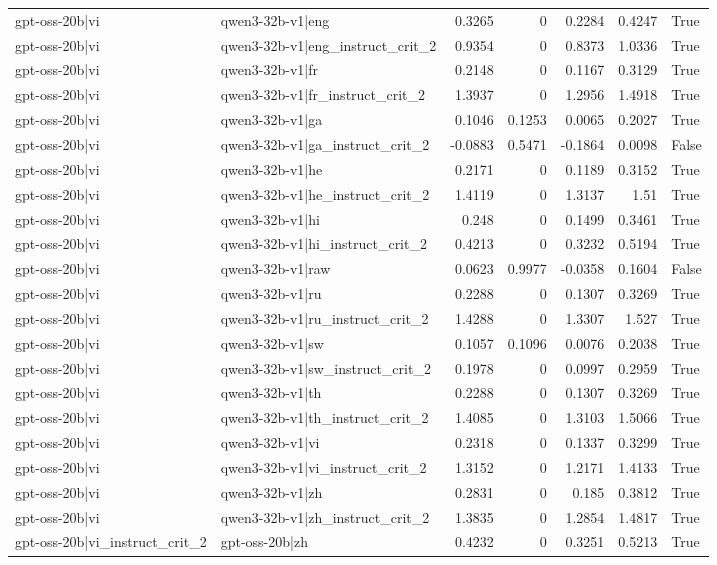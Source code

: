 \begin{table}
\begin{tabular}{l l r r r r l}
gpt-oss-20b|vi & qwen3-32b-v1|eng & 0.3265 & 0 & 0.2284 & 0.4247 & True \\
gpt-oss-20b|vi & qwen3-32b-v1|eng_instruct_crit_2 & 0.9354 & 0 & 0.8373 & 1.0336 & True \\
gpt-oss-20b|vi & qwen3-32b-v1|fr & 0.2148 & 0 & 0.1167 & 0.3129 & True \\
gpt-oss-20b|vi & qwen3-32b-v1|fr_instruct_crit_2 & 1.3937 & 0 & 1.2956 & 1.4918 & True \\
gpt-oss-20b|vi & qwen3-32b-v1|ga & 0.1046 & 0.1253 & 0.0065 & 0.2027 & True \\
gpt-oss-20b|vi & qwen3-32b-v1|ga_instruct_crit_2 & -0.0883 & 0.5471 & -0.1864 & 0.0098 & False \\
gpt-oss-20b|vi & qwen3-32b-v1|he & 0.2171 & 0 & 0.1189 & 0.3152 & True \\
gpt-oss-20b|vi & qwen3-32b-v1|he_instruct_crit_2 & 1.4119 & 0 & 1.3137 & 1.51 & True \\
gpt-oss-20b|vi & qwen3-32b-v1|hi & 0.248 & 0 & 0.1499 & 0.3461 & True \\
gpt-oss-20b|vi & qwen3-32b-v1|hi_instruct_crit_2 & 0.4213 & 0 & 0.3232 & 0.5194 & True \\
gpt-oss-20b|vi & qwen3-32b-v1|raw & 0.0623 & 0.9977 & -0.0358 & 0.1604 & False \\
gpt-oss-20b|vi & qwen3-32b-v1|ru & 0.2288 & 0 & 0.1307 & 0.3269 & True \\
gpt-oss-20b|vi & qwen3-32b-v1|ru_instruct_crit_2 & 1.4288 & 0 & 1.3307 & 1.527 & True \\
gpt-oss-20b|vi & qwen3-32b-v1|sw & 0.1057 & 0.1096 & 0.0076 & 0.2038 & True \\
gpt-oss-20b|vi & qwen3-32b-v1|sw_instruct_crit_2 & 0.1978 & 0 & 0.0997 & 0.2959 & True \\
gpt-oss-20b|vi & qwen3-32b-v1|th & 0.2288 & 0 & 0.1307 & 0.3269 & True \\
gpt-oss-20b|vi & qwen3-32b-v1|th_instruct_crit_2 & 1.4085 & 0 & 1.3103 & 1.5066 & True \\
gpt-oss-20b|vi & qwen3-32b-v1|vi & 0.2318 & 0 & 0.1337 & 0.3299 & True \\
gpt-oss-20b|vi & qwen3-32b-v1|vi_instruct_crit_2 & 1.3152 & 0 & 1.2171 & 1.4133 & True \\
gpt-oss-20b|vi & qwen3-32b-v1|zh & 0.2831 & 0 & 0.185 & 0.3812 & True \\
gpt-oss-20b|vi & qwen3-32b-v1|zh_instruct_crit_2 & 1.3835 & 0 & 1.2854 & 1.4817 & True \\
gpt-oss-20b|vi_instruct_crit_2 & gpt-oss-20b|zh & 0.4232 & 0 & 0.3251 & 0.5213 & True \\

\end{tabular}
\end{table}
